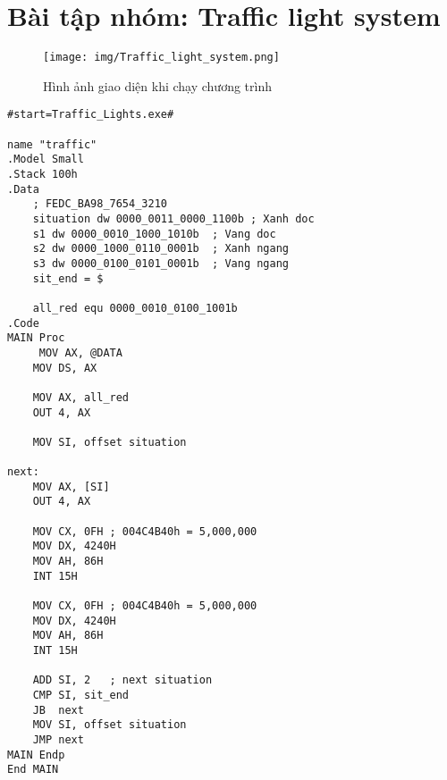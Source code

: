 \documentclass{article}
\begin{document}
\newpage
\section{Bài tập nhóm: Traffic light system}

\begin{figure}[H]
    \centering
    \texttt{[image: img/Traffic\_light\_system.png]}
    \caption{Hình ảnh giao diện khi chạy chương trình}
    \label{fig:before_input}
\end{figure}

\begin{lstlisting}[caption={Traffic light system}]
#start=Traffic_Lights.exe#

name "traffic"
.Model Small
.Stack 100h
.Data
    ; FEDC_BA98_7654_3210
    situation dw 0000_0011_0000_1100b ; Xanh doc  
    s1 dw 0000_0010_1000_1010b  ; Vang doc
    s2 dw 0000_1000_0110_0001b  ; Xanh ngang
    s3 dw 0000_0100_0101_0001b  ; Vang ngang
    sit_end = $

    all_red equ 0000_0010_0100_1001b
.Code
MAIN Proc
     MOV AX, @DATA
    MOV DS, AX
    
    MOV AX, all_red
    OUT 4, AX
    
    MOV SI, offset situation

next:
    MOV AX, [SI]
    OUT 4, AX

    MOV CX, 0FH ; 004C4B40h = 5,000,000
    MOV DX, 4240H
    MOV AH, 86H
    INT 15H   
    
    MOV CX, 0FH ; 004C4B40h = 5,000,000
    MOV DX, 4240H
    MOV AH, 86H
    INT 15H
    
    ADD SI, 2   ; next situation
    CMP SI, sit_end
    JB  next
    MOV SI, offset situation
    JMP next
MAIN Endp
End MAIN
\end{lstlisting}
\end{document}
